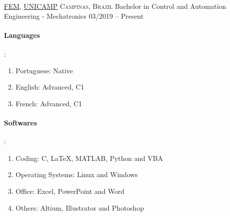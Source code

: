 \documentclass[8pt, a4paper]{article}
\begin{document}
\headedsection
    {\href{https://www.fem.unicamp.br/index.php/pt-br/}{FEM}, \href{https://www.unicamp.br/unicamp/universidade}{UNICAMP}}
    {\textsc{Campinas, Brazil}}
    {
    \headedsubsection
        {Bachelor in Control and Automation Engineering - Mechatronics}
        {03/2019 -- Present}
        {\bodytext{}}
    }

\spacedhrule{0.5em}{-0.4em}


\begin{multicols}{2}
    \paragraph{Languages}:
    \begin{enumerate}
        \item Portuguese: Native
        \item English: Advanced, C1
        \item French: Advanced, C1
    \end{enumerate}
    \columnbreak
    \paragraph{Softwares}:
    \begin{enumerate}
        \item Coding: C, LaTeX, MATLAB, Python and VBA
        \item Operating Systems: Linux and Windows
        \item Office: Excel, PowerPoint and Word
        \item Others: Altium, Illustrator and Photoshop
    \end{enumerate}
\end{multicols}
\end{document}
